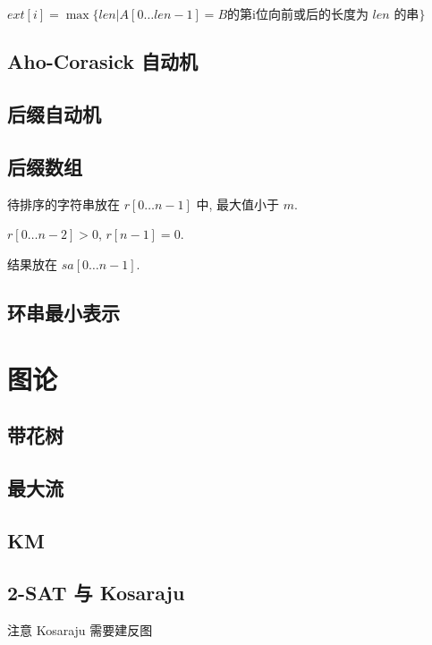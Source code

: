 \documentclass[landscape, twocolumn, 8pt, a4paper, twoside]{extarticle}
\begin{document}
    $ext[i] = \max\{len | A[0 \ldots len - 1] = B \textrm{的第i位向前或后的长度为 $len$ 的串} \}$
    

  \subsection{Aho-Corasick 自动机}
    

  \subsection{后缀自动机}
    

  \subsection{后缀数组}
    待排序的字符串放在 $r[0 \ldots n - 1]$ 中, 最大值小于 $m$.
    
    $r[0 \ldots n - 2] > 0$, $r[n - 1] = 0$.
    
    结果放在 $sa[0 \ldots n - 1]$.
    
  
  \subsection{环串最小表示}
    

\section{图论}
  \subsection{带花树}
    

  \subsection{最大流}
    
  
  \subsection{KM}
    

  \subsection{2-SAT 与 Kosaraju}
    注意 Kosaraju 需要建反图
    
\end{document}
